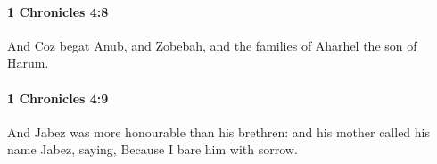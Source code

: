		\paragraph{1 Chronicles 4:8} %
			\label{1CHRONICLES-4-8}

			And Coz begat Anub, and Zobebah, and the families of Aharhel the son of Harum.


		\paragraph{1 Chronicles 4:9} %
			\label{1CHRONICLES-4-9}

			And Jabez was more honourable than his brethren: and his mother called his name Jabez, saying, Because I bare him with sorrow.


